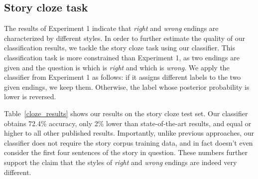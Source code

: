 \documentclass[11pt,a4paper]{article}
\newcommand{\tabref}[1]{Table~\ref{#1}}
\newcommand{\com}[1]{}
\newcommand{\resolved}[1]{}
\newcommand{\roy}[1]{{\color{orange}\textsc{[#1 --rs]}}}
\newcommand{\nascomment}[1]{{\color{blue}\textsc{[#1 --nas]}}}
\renewcommand{\roy}[1]{{\color{orange}[#1 --rs]}}
\renewcommand{\roy}[1]{#1}
\renewcommand{\nascomment}[1]{}
\begin{document}
\subsection{Story cloze task}
The results of Experiment 1 indicate that {\it right} and {\it wrong} endings are characterized by different styles.
In order to further estimate the quality of our classification results, we tackle the story cloze task using our classifier.
This classification task is more constrained than Experiment 1, as two
endings are given and the question is which is \emph{right} and which is
\emph{wrong}.
We apply the classifier from Experiment 1 as follows:
if it assigns different labels to the two given endings, we keep
them.  Otherwise, the label whose posterior probability is lower is reversed.

\tabref{cloze_results} shows our results on the story cloze test
set. Our classifier obtains 72.4\% accuracy, \roy{only 2\% lower than state-of-the-art results, and equal or higher to all other published results}\com{12.5\% (absolute) higher than the
published state-of-the-art result on the task \cite{Salle:2016}}\resolved{\nascomment{cite that here}}.
Importantly, unlike previous approaches, our classifier does not require the story corpus training data, and in fact doesn't even consider the first four sentences of the story in question.
These numbers further support the claim that the styles of {\it right} and {\it wrong} endings are indeed very different.
\end{document}
